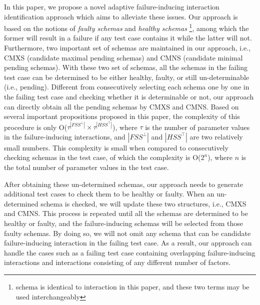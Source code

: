 In this paper, we propose a novel adaptive failure-inducing interaction identification approach which aims to alleviate these issues. Our approach is based on the notions of \emph{faulty schemas} and \emph{healthy schemas} \footnote{schema is identical to interaction in this paper, and these two terms may be used interchangeably}, among which the former will result in a failure if any test case contains it while the latter will not. Furthermore, two important set of schemas are maintained in our approach, i.e., CMXS (candidate maximal pending schemas) and CMNS (candidate minimal pending schemas). With these two set of schemas, all the schemas in the failing test case can be determined to be either healthy, faulty, or still un-determinable (i.e., pending). Different from consecutively selecting each schema one by one in the failing test case and checking whether it is determinable or not, our approach can directly obtain all the pending schemas by CMXS and CMNS. Based on several important propositions proposed in this paper, the complexity of this procedure is only O($ \tau^{|FSS^{\bot}|} \times \tau^{|HSS^{\top}|}$), where $\tau$ is the number of parameter values in the failure-inducing interactions, and $|FSS^{\bot}|$ and $|HSS^{\top}|$ are two relatively small numbers. This complexity is small when compared to consecutively checking schemas in the test case, of which the complexity is O($2^{n}$), where $n$ is the total number of parameter values in the test case.

After obtaining these un-determined schemas, our approach needs to generate additional test cases to check them to be healthy or faulty. When an un-determined schema is checked, we will update these two structures, i.e., CMXS and CMNS. This process is repeated until all the schemas are determined to be healthy or faulty, and the failure-inducing schemas will be selected from those faulty schemas. By doing so, we will not omit any schema that can be candidate failure-inducing interaction in the failing test case. As a result, our approach can handle the cases such as a failing test case containing overlapping failure-inducing interactions and interactions consisting of any different number of factors.

